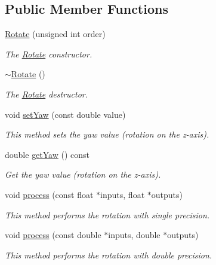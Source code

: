 \subsection*{Public Member Functions}
\begin{DoxyCompactItemize}
\item 
\hyperlink{class_hoa2_d_1_1_rotate_a2aa145bb455c0538ce2ca2bd058d8800}{Rotate} (unsigned int order)
\begin{DoxyCompactList}\small\item\em The \hyperlink{class_hoa2_d_1_1_rotate}{Rotate} constructor. \end{DoxyCompactList}\item 
\hyperlink{class_hoa2_d_1_1_rotate_a7e70e8d9099c1b8a2a42313e464130b2}{$\sim$\-Rotate} ()
\begin{DoxyCompactList}\small\item\em The \hyperlink{class_hoa2_d_1_1_rotate}{Rotate} destructor. \end{DoxyCompactList}\item 
void \hyperlink{class_hoa2_d_1_1_rotate_abc51eceaf32e9844d829a816094f6ac5}{set\-Yaw} (const double value)
\begin{DoxyCompactList}\small\item\em This method sets the yaw value (rotation on the z-\/axis). \end{DoxyCompactList}\item 
double \hyperlink{class_hoa2_d_1_1_rotate_a5f40eff256bd5b845d6b4cfc046cd84e}{get\-Yaw} () const 
\begin{DoxyCompactList}\small\item\em Get the yaw value (rotation on the z-\/axis). \end{DoxyCompactList}\item 
void \hyperlink{class_hoa2_d_1_1_rotate_a88bfa68435d940b0c4c1ae0c97baeffd}{process} (const float $\ast$inputs, float $\ast$outputs)
\begin{DoxyCompactList}\small\item\em This method performs the rotation with single precision. \end{DoxyCompactList}\item 
void \hyperlink{class_hoa2_d_1_1_rotate_a8d5ecedca52ad2216efe218b5dcbf834}{process} (const double $\ast$inputs, double $\ast$outputs)
\begin{DoxyCompactList}\small\item\em This method performs the rotation with double precision. \end{DoxyCompactList}\end{DoxyCompactItemize}


